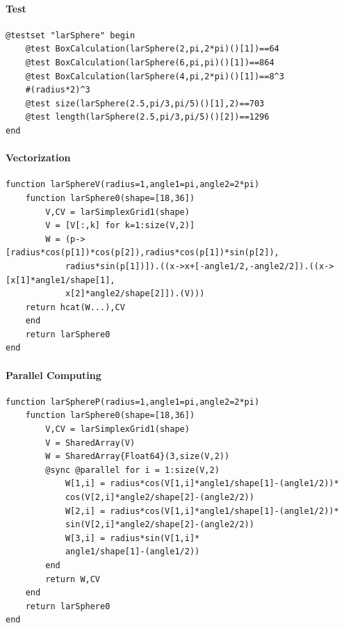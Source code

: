 \documentclass{article}
\begin{document}
\paragraph{Test}
\begin{Verbatim}
@testset "larSphere" begin
	@test BoxCalculation(larSphere(2,pi,2*pi)()[1])==64
	@test BoxCalculation(larSphere(6,pi,pi)()[1])==864
	@test BoxCalculation(larSphere(4,pi,2*pi)()[1])==8^3
	#(radius*2)^3
	@test size(larSphere(2.5,pi/3,pi/5)()[1],2)==703
	@test length(larSphere(2.5,pi/3,pi/5)()[2])==1296
end
\end{Verbatim}

\paragraph{Vectorization}

\begin{verbatim}
function larSphereV(radius=1,angle1=pi,angle2=2*pi)
    function larSphere0(shape=[18,36])
        V,CV = larSimplexGrid1(shape)
        V = [V[:,k] for k=1:size(V,2)]
        W = (p->[radius*cos(p[1])*cos(p[2]),radius*cos(p[1])*sin(p[2]),
            radius*sin(p[1])]).((x->x+[-angle1/2,-angle2/2]).((x->[x[1]*angle1/shape[1],
            x[2]*angle2/shape[2]]).(V)))
    return hcat(W...),CV
    end
    return larSphere0    
end
\end{verbatim}

\paragraph{Parallel Computing}
\begin{Verbatim}
function larSphereP(radius=1,angle1=pi,angle2=2*pi)
    function larSphere0(shape=[18,36])
        V,CV = larSimplexGrid1(shape)
        V = SharedArray(V)
        W = SharedArray{Float64}(3,size(V,2))
        @sync @parallel for i = 1:size(V,2)
            W[1,i] = radius*cos(V[1,i]*angle1/shape[1]-(angle1/2))*
            cos(V[2,i]*angle2/shape[2]-(angle2/2))
            W[2,i] = radius*cos(V[1,i]*angle1/shape[1]-(angle1/2))*
            sin(V[2,i]*angle2/shape[2]-(angle2/2))
            W[3,i] = radius*sin(V[1,i]*
            angle1/shape[1]-(angle1/2))
        end
        return W,CV
    end
    return larSphere0    
end
\end{Verbatim}
\end{document}
